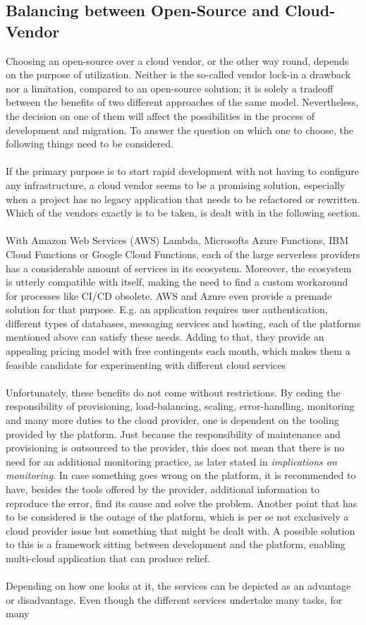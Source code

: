 \documentclass[11pt]{article}
\begin{document}
\subsection{Balancing between Open-Source and Cloud-Vendor}
Choosing an open-source over a cloud vendor, or the other way round, depends on the purpose of utilization. Neither is the so-called vendor lock-in a drawback nor a limitation, compared to an open-source solution; it is solely a tradeoff between the benefits of two different approaches of the same model. Nevertheless, the decision on one of them will affect the possibilities in the process of development and migration. To answer the question on which one to choose, the following things need to be considered.\\\\If the primary purpose is to start rapid development with not having to configure any infrastructure, a cloud vendor seems to be a promising solution, especially when a project has no legacy application that needs to be refactored or rewritten. Which of the vendors exactly is to be taken, is dealt with in the following section.\\\\With Amazon Web Services (AWS) Lambda, Microsofts Azure Functions, IBM Cloud Functions or Google Cloud Functions, each of the large serverless providers has a considerable amount of services in its ecosystem. Moreover, the ecosystem is utterly compatible with itself, making the need to find a custom workaround for processes like CI/CD obsolete. AWS and Azure even provide a premade solution for that purpose. E.g. an application requires user authentication, different types of databases, messaging services and hosting, each of the platforms mentioned above can satisfy these needs. Adding to that, they provide an appealing pricing model with free contingents each month, which makes them a feasible candidate for experimenting with different cloud services \\\\Unfortunately, these benefits do not come without restrictions. By ceding the responsibility of provisioning, load-balancing, scaling, error-handling, monitoring and many more duties to the cloud provider, one is dependent on the tooling provided by the platform. Just because the responsibility of maintenance and provisioning is outsourced to the provider, this does not mean that there is no need for an additional monitoring practice, as later stated in \textit{implications on monitoring}. In case something goes wrong on the platform, it is recommended to have, besides the tools offered by the provider, additional information to reproduce the error, find its cause and solve the problem. Another point that has to be considered is the outage of the platform, which is per se not exclusively a cloud provider issue but something that might be dealt with. A possible solution to this is a framework sitting between development and the platform, enabling multi-cloud application that can produce relief.\\\\ Depending on how one looks at it, the services can be depicted as an advantage or disadvantage. Even though the different services undertake many tasks, for many 
\end{document}
